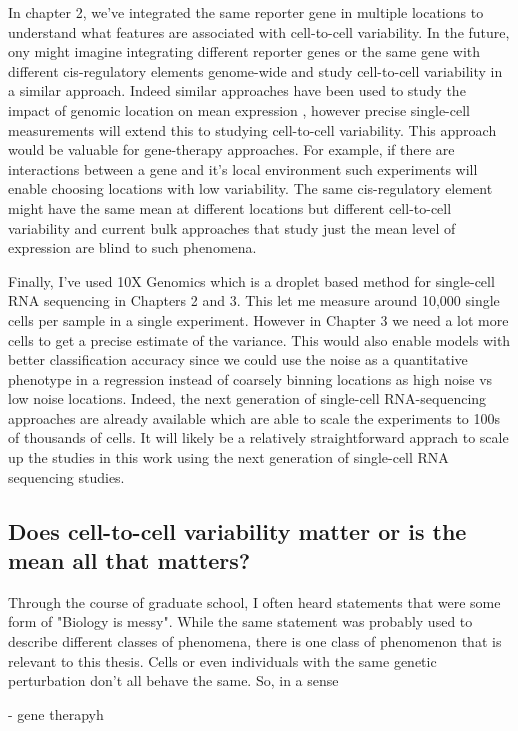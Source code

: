 In chapter 2, we've integrated the same reporter gene in multiple locations to understand what features are associated with cell-to-cell variability. In the future, ony might imagine integrating different reporter genes or the same gene with different cis-regulatory elements genome-wide and study cell-to-cell variability in a similar approach. Indeed similar approaches have been used to study the impact of genomic location on mean expression \cite{claraice's papers}, however precise single-cell measurements will extend this to studying cell-to-cell variability. This approach would be valuable for gene-therapy approaches. For example, if there are interactions between a gene and it's local environment such experiments will enable choosing locations with low variability. The same cis-regulatory element might have the same mean at different locations but different cell-to-cell variability and current bulk approaches that study just the mean level of expression are blind to such phenomena.

Finally, I've used 10X Genomics which is a droplet based method for single-cell RNA sequencing in Chapters 2 and 3. \cite{10X} This let me measure around 10,000 single cells per sample in a single experiment. However in Chapter 3 we need a lot more cells to get a precise estimate of the variance. This would also enable models with better classification accuracy since we could use the noise as a quantitative phenotype in a regression instead of coarsely binning locations as high noise vs low noise locations. Indeed, the next generation of single-cell RNA-sequencing approaches are already available \cite{sci-RNAseq} \cite{Parse} which are able to scale the experiments to 100s of thousands of cells. It will likely be a relatively straightforward apprach to scale up the studies in this work using the next generation of single-cell RNA sequencing studies. 

\subsection{Does cell-to-cell variability matter or is the mean all that matters?}
Through the course of graduate school, I often heard statements that were some form of "Biology is messy". While the same statement was probably used to describe different classes of phenomena, there is one class of phenomenon that is relevant to this thesis. Cells or even individuals with the same genetic perturbation don't all behave the same. So, in a sense 

- gene therapyh
